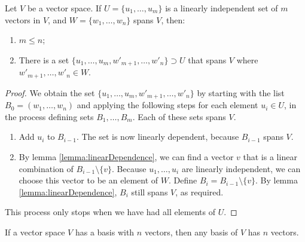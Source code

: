 \begin{theorem} \label{theorem:SteinitzExchange}
Let $V$ be a vector space.
If $U = \{u_1, \ldots, u_m\}$ is a linearly independent set of $m$ vectors in $V$, and $W = \{ w_1, \ldots, w_n \}$ spans $V$, then:
\begin{enumerate}
\item $m\leq n$;
\item There is a set $\{u_1, \ldots, u_m, w'_{m+1}, \ldots, w'_n\} \supset U$ that spans $V$ where $w'_{m+1},\ldots, w'_n \in W$.
\end{enumerate}
\end{theorem}
\begin{proof}
We obtain the set $\{u_1, \ldots, u_m, w'_{m+1}, \ldots, w'_n\}$ by starting with the list $B_0 = (w_1, \ldots, w_n)$ and applying the following steps for each element $u_i \in U$, in the process defining sets $B_1, \ldots, B_m$. Each of these sets spans $V$.
\begin{enumerate}
\item Add $u_i$ to $B_{i-1}$. The set is now linearly dependent, because $B_{i-1}$ spans $V$.
\item By lemma \ref{lemma:linearDependence}, we can find a vector $v$ that is a linear combination of $B_{i-1}\setminus \{v\}$. Because $u_1,\ldots, u_i$ are linearly independent, we can choose this vector to be an element of $W$. Define $B_i = B_{i-1}\setminus\{v\}$. By lemma \ref{lemma:linearDependence}, $B_i$ still spans $V$, as required.
\end{enumerate}
This process only stops when we have had all elements of $U$.
\end{proof}
\begin{corollary}
If a vector space $V$ has a basis with $n$ vectors, then any basis of $V$ has $n$ vectors. \label{corollary:nBasis}
\end{corollary}

